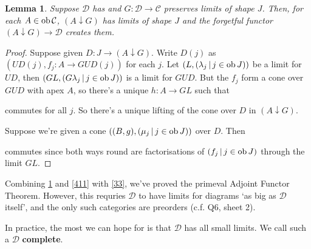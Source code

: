 \documentclass[a4paper]{article}
\newtheorem{lemma}[definition]{Lemma}
\numberwithin{definition}{section}
\newcommand*\ob[1]{\textnormal{ob}\,#1}
\begin{document}
\begin{lemma}
	Suppose $\mathcal{D}$ has and $G: \mathcal{D} \to \mathcal{C}$ preserves limits of shape $J$.
	Then, for each $A \in \ob \mathcal{C}$,
	$(A \downarrow G)$ has limits of shape $J$ and the forgetful functor $(A \downarrow G) \to \mathcal{D}$ creates them.
	\label{412}
\end{lemma}
\begin{proof}
	Suppose given $D: J \to (A \downarrow G)$.
	Write $D(j)$ as $(UD(j), f_j: A \to GUD(j))$ for each $j$.
	Let $(L, (\lambda_j \,|\, j \in \ob J))$ be a limit for $UD$,
	then $(GL, (G\lambda_j \,|\, j \in \ob J))$ is a limit for $GUD$.
	But the $f_j$ form a cone over $GUD$ with apex $A$,
	so there's a unique $h: A \to GL$ such that
	\begin{center}
	\end{center}
	commutes for all $j$.
	So there's a unique lifting of the cone over $D$ in $(A \downarrow G)$.
	
	Suppose we're given a cone $((B, g), (\mu_j \,|\, j \in \ob J))$ over $D$.
	Then
	\begin{center}
	\end{center}
	commutes since both ways round are factorisations of $(f_j \,|\, j \in \ob J)$ through the limit $GL$.
\end{proof}

Combining \ref{412} and \ref{411} with \ref{33},
we've proved the primeval Adjoint Functor Theorem.
However, this requries $\mathcal{D}$ to have limits for diagrams `as big as $\mathcal{D}$ itself',
and the only such categories are preorders (c.f. Q6, sheet 2).

In practice, the most we can hope for is that $\mathcal{D}$ has all small limits.
We call such a $\mathcal{D}$ \textbf{complete}.
\end{document}
